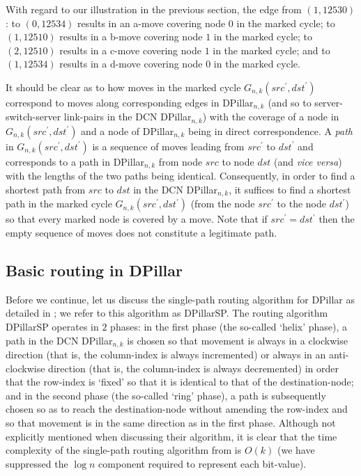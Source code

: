 \documentclass{article}
\begin{document}
With regard to our illustration in the previous section, the edge from $(1,12530)$: to $(0,12534)$ results in an a-move covering node $0$ in the marked cycle; to $(1,12510)$ results in a b-move covering node $1$ in the marked cycle; to $(2,12510)$  results in a c-move covering node $1$ in the marked cycle; and to $(1,12534)$ results in a d-move covering node $0$ in the marked cycle.

It should be clear as to how moves in the marked cycle $G_{n,k}(src^\prime,dst^\prime)$ correspond to moves along corresponding edges in DPillar$_{n,k}$ (and so to server-switch-server link-pairs in the DCN DPillar$_{n,k}$) with the coverage of a node in $G_{n,k}(src^\prime,dst^\prime)$ and a node of DPillar$_{n,k}$ being in direct correspondence. A \emph{path\/} in $G_{n,k}(src^\prime,dst^\prime)$ is a sequence of moves leading from $src^\prime$ to $dst^\prime$ and corresponds to a path in DPillar$_{n,k}$ from node $src$ to node $dst$ (and \emph{vice versa\/}) with the lengths of the two paths being identical. Consequently, in order to find a shortest path from $src$ to $dst$ in the DCN DPillar$_{n,k}$, it suffices to find a shortest path in the marked cycle $G_{n,k}(src^\prime,dst^\prime)$ (from the node $src^\prime$ to the node $dst^\prime$) so that every marked node is covered by a move. Note that if $src^\prime=dst^\prime$ then the empty sequence of moves does not constitute a legitimate path.

\subsection{Basic routing in DPillar}

Before we continue, let us discuss the single-path routing algorithm for DPillar as detailed in \cite{LYY12}; we refer to this algorithm as DPillarSP. The routing algorithm DPillarSP operates in $2$ phases: in the first phase (the so-called `helix' phase), a path in the DCN DPillar$_{n,k}$ is chosen so that movement is always in a clockwise direction (that is, the column-index is always incremented) or always in an anti-clockwise direction (that is, the column-index is always decremented) in order that the row-index is `fixed' so that it is identical to that of the destination-node; and in the second phase (the so-called `ring' phase), a path is subsequently chosen so as to reach the destination-node without amending the row-index and so that movement is in the same direction as in the first phase. Although not explicitly mentioned when discussing their algorithm, it is clear that the time complexity of the single-path routing algorithm from \cite{LYY12} is $O(k)$ (we have suppressed the $\log n$ component required to represent each bit-value).
\end{document}
